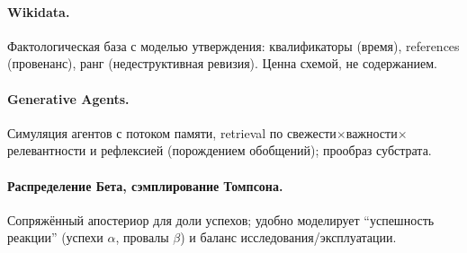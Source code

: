\paragraph{Wikidata.} Фактологическая база с моделью утверждения:
квалификаторы (время), references (провенанс), ранг (недеструктивная
ревизия). Ценна схемой, не содержанием.

\paragraph{Generative Agents.} Симуляция агентов с потоком памяти, retrieval
по свежести$\times$важности$\times$релевантности и рефлексией (порождением
обобщений); прообраз субстрата.

\paragraph{Распределение Бета, сэмплирование Томпсона.} Сопряжённый
апостериор для доли успехов; удобно моделирует ``успешность реакции''
(успехи $\alpha$, провалы $\beta$) и баланс исследования/эксплуатации.
